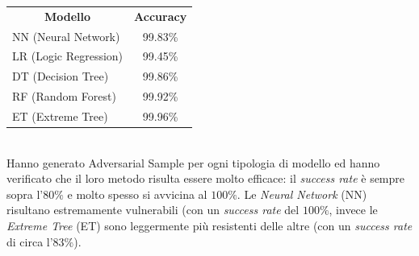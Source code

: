 \begin{center}
    \begin{tabular}{l|c}
        \multicolumn{1}{c}{\textbf{Modello}} & \multicolumn{1}{c}{\textbf{Accuracy}}  \\ [0.5 em]
        NN (Neural Network) & 99.83\% \\ [0.5 em]
        LR (Logic Regression) & 99.45\% \\ [0.5 em]
        DT (Decision Tree) & 99.86\% \\ [0.5 em]
        RF (Random Forest) & 99.92\% \\ [0.5 em]
        ET (Extreme Tree) & 99.96\% \\
    \end{tabular}
\end{center}
\ \\
Hanno generato Adversarial Sample per ogni tipologia di modello ed hanno verificato che il loro metodo risulta essere molto efficace: il \textit{success rate} è sempre sopra l'\(80\%\)\cite{iot} e molto spesso si avvicina al \(100\%\)\cite{iot}. Le \textit{Neural Network} (NN) risultano estremamente vulnerabili (con un \textit{success rate} del \(100\%\), invece le \textit{Extreme Tree} (ET) sono leggermente più resistenti delle altre (con un \textit{success rate} di circa l'\(83\%\)).


